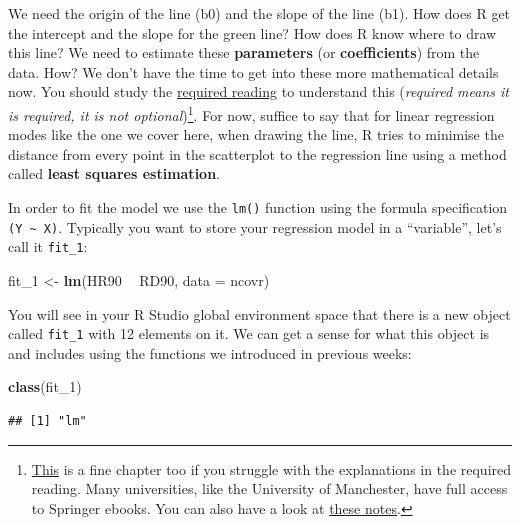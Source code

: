 \documentclass[]{book}
\newenvironment{Shaded}{\begin{snugshade}}{\end{snugshade}}
\newcommand{\DataTypeTok}[1]{\textcolor[rgb]{0.13,0.29,0.53}{#1}}
\newcommand{\DecValTok}[1]{\textcolor[rgb]{0.00,0.00,0.81}{#1}}
\newcommand{\KeywordTok}[1]{\textcolor[rgb]{0.13,0.29,0.53}{\textbf{#1}}}
\newcommand{\NormalTok}[1]{#1}
\newcommand{\OperatorTok}[1]{\textcolor[rgb]{0.81,0.36,0.00}{\textbf{#1}}}
\newcommand{\StringTok}[1]{\textcolor[rgb]{0.31,0.60,0.02}{#1}}
\begin{document}
We need the origin of the line (b0) and the slope of the line (b1). How does R get the intercept and the slope for the green line? How does R know where to draw this line? We need to estimate these \textbf{parameters} (or \textbf{coefficients}) from the data. How? We don't have the time to get into these more mathematical details now. You should study the \href{http://link.springer.com/chapter/10.1007/978-1-4614-7138-7_3}{required reading} to understand this (\emph{required means it is required, it is not optional})\footnote{\href{http://link.springer.com/chapter/10.1007/978-1-4614-9170-5_15}{This} is a fine chapter too if you struggle with the explanations in the required reading. Many universities, like the University of Manchester, have full access to Springer ebooks. You can also have a look at \href{http://people.stern.nyu.edu/wgreene/Statistics/MultipleRegressionBasicsCollection.pdf}{these notes}.}. For now, suffice to say that for linear regression modes like the one we cover here, when drawing the line, R tries to minimise the distance from every point in the scatterplot to the regression line using a method called \textbf{least squares estimation}.

In order to fit the model we use the \texttt{lm()} function using the formula specification \texttt{(Y\ \textasciitilde{}\ X)}. Typically you want to store your regression model in a ``variable'', let's call it \texttt{fit\_1}:

\begin{Shaded}
\begin{Highlighting}[]
\NormalTok{fit_}\DecValTok{1}\NormalTok{ <-}\StringTok{ }\KeywordTok{lm}\NormalTok{(HR90 }\OperatorTok{~}\StringTok{ }\NormalTok{RD90, }\DataTypeTok{data =}\NormalTok{ ncovr)}
\end{Highlighting}
\end{Shaded}

You will see in your R Studio global environment space that there is a new object called \texttt{fit\_1} with 12 elements on it. We can get a sense for what this object is and includes using the functions we introduced in previous weeks:

\begin{Shaded}
\begin{Highlighting}[]
\KeywordTok{class}\NormalTok{(fit_}\DecValTok{1}\NormalTok{)}
\end{Highlighting}
\end{Shaded}

\begin{verbatim}
## [1] "lm"
\end{verbatim}
\end{document}
